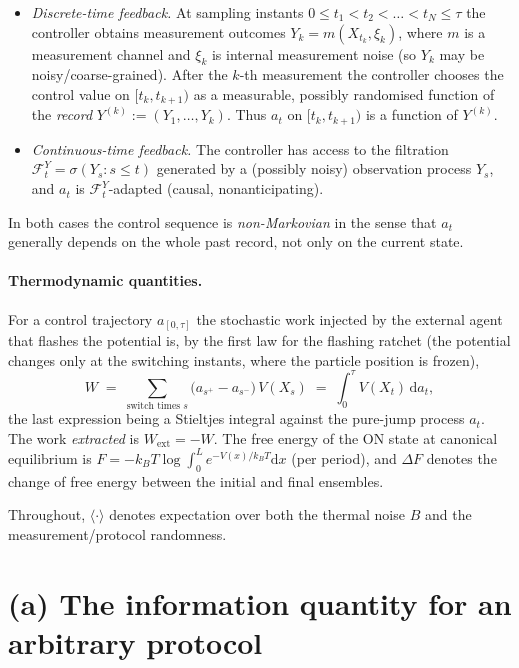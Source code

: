 \documentclass{amsart}
\theoremstyle{definition}
\newcommand{\kB}{k_{B}}
\newcommand{\dd}{\mathrm{d}}
\begin{document}
\begin{itemize}
\item \emph{Discrete-time feedback.} At sampling instants
$0\le t_1<t_2<\dots<t_N\le\tau$ the controller obtains measurement outcomes
$Y_k=m(X_{t_k},\xi_k)$, where $m$ is a measurement channel and $\xi_k$ is
internal measurement noise (so $Y_k$ may be noisy/coarse-grained). After the
$k$-th measurement the controller chooses the control value on
$[t_k,t_{k+1})$ as a measurable, possibly randomised function of the
\emph{record} $Y^{(k)}:=(Y_1,\dots,Y_k)$. Thus $a_t$ on $[t_k,t_{k+1})$ is a
function of $Y^{(k)}$.

\item \emph{Continuous-time feedback.} The controller has access to the
filtration $\mathcal F^Y_t=\sigma(Y_s:s\le t)$ generated by a (possibly noisy)
observation process $Y_s$, and $a_t$ is $\mathcal F^Y_t$-adapted (causal,
nonanticipating).
\end{itemize}

In both cases the control sequence is \emph{non-Markovian} in the sense that
$a_t$ generally depends on the whole past record, not only on the current
state.

\paragraph{Thermodynamic quantities.}
For a control trajectory $a_{[0,\tau]}$ the stochastic work injected by the
external agent that flashes the potential is, by the first law for the
flashing ratchet (the potential changes only at the switching instants, where
the particle position is frozen),
\begin{equation}\label{eq:work}
W \;=\; \sum_{\text{switch times }s} \bigl(a_{s^+}-a_{s^-}\bigr)\,V(X_s)
\;=\; \int_0^\tau V(X_t)\,\dd a_t ,
\end{equation}
the last expression being a Stieltjes integral against the pure-jump process
$a_t$. The work \emph{extracted} is $W_{\mathrm{ext}}=-W$. The free energy of
the ON state at canonical equilibrium is
$F=-\kB T\log\!\int_0^L e^{-V(x)/\kB T}\dd x$ (per period), and $\Delta F$
denotes the change of free energy between the initial and final ensembles.

Throughout, $\langle\cdot\rangle$ denotes expectation over both the thermal
noise $B$ and the measurement/protocol randomness.

\section{(a) The information quantity for an arbitrary protocol}
\end{document}
